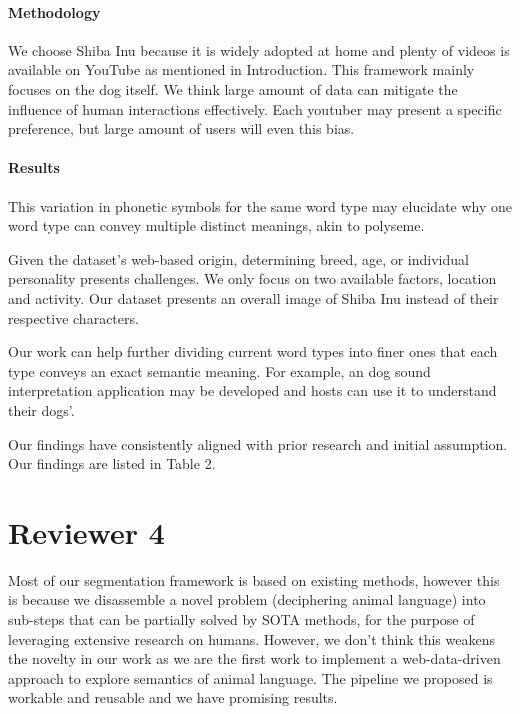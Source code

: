 \documentclass[letterpaper]{article}
\newcommand{\MY}[1]{\textcolor{orange}{(Mengyue: #1)}}
\begin{document}
\paragraph{Methodology}
We choose Shiba Inu because it is widely adopted at home and plenty of videos is available on YouTube as mentioned in Introduction. 
This framework mainly focuses on the dog itself. We think large amount of data can mitigate the influence of human interactions effectively. Each youtuber may present a specific preference, but large amount of users will even this bias. %

\paragraph{Results}
This variation in phonetic symbols for the same word type may elucidate why one word type can convey multiple distinct meanings, akin to polyseme. %

Given the dataset's web-based origin, determining breed, age, or individual personality presents challenges. We only focus on two available factors, location and activity. Our dataset presents an overall image of Shiba Inu instead of their respective characters. 

Our work can help further dividing current word types into finer ones that each type conveys an exact semantic meaning. For example, an dog sound interpretation application may be developed and hosts can use it to understand their dogs'. 

Our findings have consistently aligned with prior research and initial assumption. Our findings are listed in Table 2. 


\section{Reviewer 4}
Most of our segmentation framework is based on existing methods, however this is because we disassemble a novel problem (deciphering animal language) into sub-steps that can be partially solved by SOTA methods, for the purpose of leveraging extensive research on humans. However, we don't think this weakens the novelty in our work as we are the first work to implement a web-data-driven approach to explore semantics of animal language. The pipeline we proposed is workable and reusable and we have promising results. 
\end{document}
